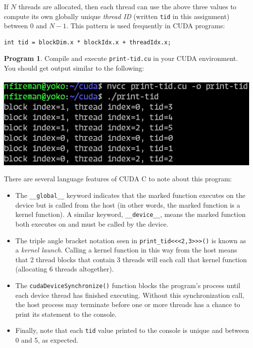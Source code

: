 \documentclass{article}
\theoremstyle{definition}
\newtheorem{program}{Program}
\begin{document}
If $N$ threads are allocated, then each thread can use the above three values to compute its own globally unique \emph{thread ID} (written \texttt{tid} in this assignment) between $0$ and $N - 1$. This pattern is used frequently in CUDA programs: \begin{verbatim}int tid = blockDim.x * blockIdx.x + threadIdx.x;\end{verbatim} 

\begin{program}
Compile and execute \texttt{print-tid.cu} in your CUDA environment. You should get output similar to the following:
\\~\\
\includegraphics[width=\textwidth]{images/print-tid-output.png}

There are several language features of CUDA C to note about this program:
\begin{itemize}
\item 
    The \texttt{\_\_global\_\_} keyword indicates that the marked function executes on the device but is called from the host (in other words, the marked function is a kernel function). A similar keyword, \texttt{\_\_device\_\_}, means the marked function both executes on and must be called by the device.
    
\item 
    The triple angle bracket notation seen in \texttt{print\_tid<<<2,3>>>()} is known as a \emph{kernel launch}. Calling a kernel function in this way from the host means that 2 thread blocks that contain 3 threads will each call that kernel function (allocating 6  threads altogether).
    
\item 
    The \texttt{cudaDeviceSynchronize()} function blocks the program's process until each device thread has finished executing. Without this synchronization call, the host process may terminate before one or more threads has a chance to print its statement to the console.
    
\item
    Finally, note that each \texttt{tid} value printed to the console is unique and between 0 and 5, as expected. 
\end{itemize}
\end{program}
\end{document}
